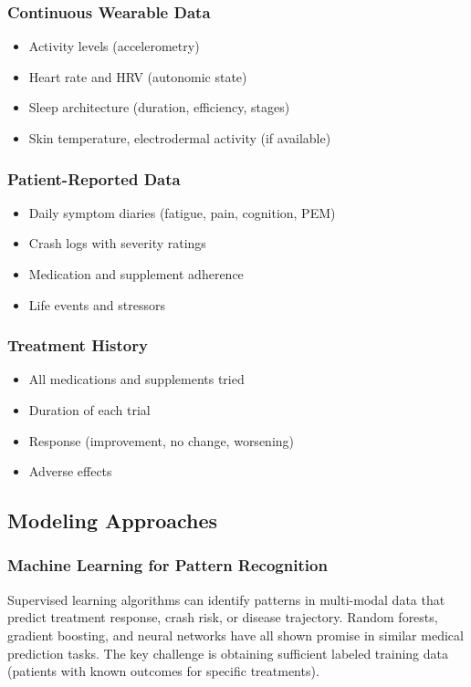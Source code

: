 \subsubsection{Continuous Wearable Data}
\begin{itemize}
    \item Activity levels (accelerometry)
    \item Heart rate and HRV (autonomic state)
    \item Sleep architecture (duration, efficiency, stages)
    \item Skin temperature, electrodermal activity (if available)
\end{itemize}

\subsubsection{Patient-Reported Data}
\begin{itemize}
    \item Daily symptom diaries (fatigue, pain, cognition, PEM)
    \item Crash logs with severity ratings
    \item Medication and supplement adherence
    \item Life events and stressors
\end{itemize}

\subsubsection{Treatment History}
\begin{itemize}
    \item All medications and supplements tried
    \item Duration of each trial
    \item Response (improvement, no change, worsening)
    \item Adverse effects
\end{itemize}

\subsection{Modeling Approaches}

\subsubsection{Machine Learning for Pattern Recognition}
Supervised learning algorithms can identify patterns in multi-modal data that predict treatment response, crash risk, or disease trajectory. Random forests, gradient boosting, and neural networks have all shown promise in similar medical prediction tasks. The key challenge is obtaining sufficient labeled training data (patients with known outcomes for specific treatments).

